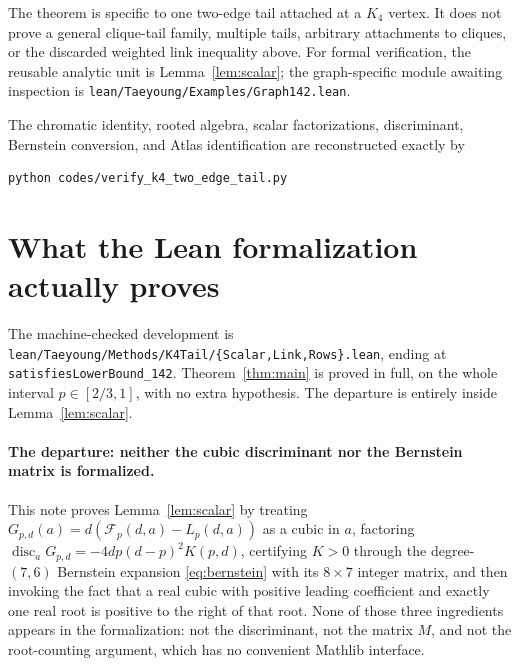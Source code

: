 \documentclass[11pt]{article}
\begin{document}
The theorem is specific to one two-edge tail attached at a $K_4$ vertex.  It
does not prove a general clique-tail family, multiple tails, arbitrary
attachments to cliques, or the discarded weighted link inequality above.
For formal verification, the reusable analytic unit is
Lemma~\ref{lem:scalar}; the graph-specific module awaiting inspection is
\texttt{lean/Taeyoung/Examples/Graph142.lean}.

The chromatic identity, rooted algebra, scalar factorizations, discriminant,
Bernstein conversion, and Atlas identification are reconstructed exactly by
\begin{verbatim}
python codes/verify_k4_two_edge_tail.py
\end{verbatim}


\section{What the Lean formalization actually proves}

The machine-checked development is
\texttt{lean/Taeyoung/Methods/K4Tail/\{Scalar,Link,Rows\}.lean}, ending at
\texttt{satisfiesLowerBound\_142}.  Theorem~\ref{thm:main} is proved in full, on
the whole interval $p\in[2/3,1]$, with no extra hypothesis.  The departure is
entirely inside Lemma~\ref{lem:scalar}.

\paragraph{The departure: neither the cubic discriminant nor the Bernstein
matrix is formalized.}
This note proves Lemma~\ref{lem:scalar} by treating
$G_{p,d}(a)=d(\mathcal F_p(d,a)-L_p(d,a))$ as a cubic in $a$, factoring
$\operatorname{disc}_aG_{p,d}=-4dp(d-p)^2K(p,d)$, certifying $K>0$ through the
degree-$(7,6)$ Bernstein expansion \eqref{eq:bernstein} with its $8\times7$
integer matrix, and then invoking the fact that a real cubic with positive
leading coefficient and exactly one real root is positive to the right of that
root.  None of those three ingredients appears in the formalization: not the
discriminant, not the matrix $M$, and not the root-counting argument, which has
no convenient Mathlib interface.
\end{document}
